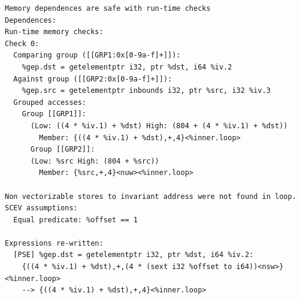 \documentclass{beamer}
\begin{document}
\begin{frame}[containsverbatim]
  \begin{adjustwidth}{-1em}{-1em}
    \begin{verbatim}
Memory dependences are safe with run-time checks
Dependences:
Run-time memory checks:
Check 0:
  Comparing group ([[GRP1:0x[0-9a-f]+]]):
    %gep.dst = getelementptr i32, ptr %dst, i64 %iv.2
  Against group ([[GRP2:0x[0-9a-f]+]]):
    %gep.src = getelementptr inbounds i32, ptr %src, i32 %iv.3
  Grouped accesses:
    Group [[GRP1]]:
      (Low: ((4 * %iv.1) + %dst) High: (804 + (4 * %iv.1) + %dst))
        Member: {((4 * %iv.1) + %dst),+,4}<%inner.loop>
      Group [[GRP2]]:
      (Low: %src High: (804 + %src))
        Member: {%src,+,4}<nuw><%inner.loop>

Non vectorizable stores to invariant address were not found in loop.
SCEV assumptions:
  Equal predicate: %offset == 1

Expressions re-written:
  [PSE] %gep.dst = getelementptr i32, ptr %dst, i64 %iv.2:
    {((4 * %iv.1) + %dst),+,(4 * (sext i32 %offset to i64))<nsw>}<%inner.loop>
    --> {((4 * %iv.1) + %dst),+,4}<%inner.loop>
    \end{verbatim}
  \end{adjustwidth}
\end{frame}
\end{document}
